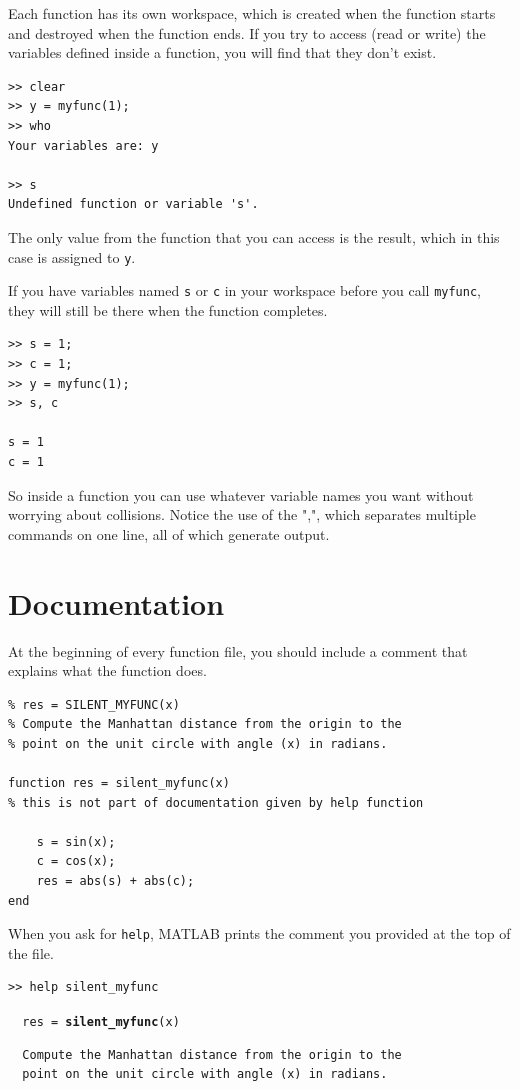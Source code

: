 \documentclass[
]{book}
\begin{document}
Each function has its own workspace, which is created when the
function starts and destroyed when the function ends.  If you try to
access (read or write) the variables defined inside a function, you
will find that they don't exist.

\begin{verbatim}
>> clear
>> y = myfunc(1);
>> who
Your variables are: y

>> s
Undefined function or variable 's'.
\end{verbatim}

The only value from the function that you can access is the result,
which in this case is assigned to {\tt y}.

If you have variables named {\tt s} or {\tt c} in your workspace
before you call {\tt myfunc}, they will still be there when the
function completes.

\begin{verbatim}
>> s = 1;
>> c = 1;
>> y = myfunc(1);
>> s, c

s = 1
c = 1
\end{verbatim}

So inside a function you can use whatever variable names you
want without worrying about collisions.
Notice the use of the ",", which separates multiple commands on
one line, all of which generate output.


\section{Documentation}

At the beginning of every function file, you should include a comment
that explains what the function does.

\begin{verbatim}
% res = SILENT_MYFUNC(x)
% Compute the Manhattan distance from the origin to the
% point on the unit circle with angle (x) in radians.

function res = silent_myfunc(x)
% this is not part of documentation given by help function

    s = sin(x);
    c = cos(x);
    res = abs(s) + abs(c);
end
\end{verbatim}

When you ask for {\tt help}, MATLAB prints the comment you
provided at the top of the file.

\begin{verbatim}
>> help silent_myfunc
\end{verbatim}
{\tt \ \  res = {\bf silent\_myfunc}(x) }
\begin{verbatim}
  Compute the Manhattan distance from the origin to the
  point on the unit circle with angle (x) in radians.

\end{verbatim}
\end{document}
